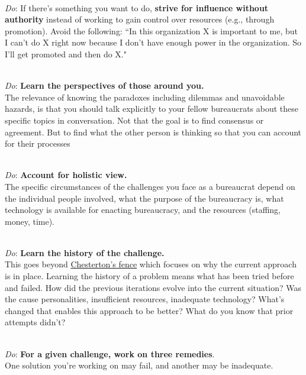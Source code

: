 \ \\
\textit{Do}: If there's something you want to do, \textbf{strive for influence without authority} instead of working to gain control over resources (e.g., through promotion). Avoid the following: ``In this organization X is important to me, but I can't do X right now because I don't have enough power in the organization. So I'll get promoted and then do X."

\ \\
\textit{Do}: \textbf{Learn the perspectives of those around you.}\\
The relevance of knowing the paradoxes including dilemmas and unavoidable hazards, is that you should talk explicitly to your fellow bureaucrats about these specific topics in conversation. Not that the goal is to find consensus or agreement. But to find what the other person is thinking so that you can account for their processes

\ \\
\textit{Do}: \textbf{Account for holistic view.}\\
The specific circumstances of the challenges you face as a bureaucrat depend on the individual people involved, what the purpose of the bureaucracy is, what technology is available for enacting bureaucracy, and the resources (staffing, money, time). 

\ \\
\textit{Do}: \textbf{Learn the history of the challenge.}\\
This goes beyond
\href{https://en.wikipedia.org/wiki/G._K._Chesterton\%23Chesterton's_fence}{Chesterton's fence}\iftoggle{haspagenumbers}{ (see page~\pageref{concept:chestertons_fence}), }{,}%
%
\iftoggle{WPinmargin}{\marginpar{$>$Wikipedia: Chesterton's fence}}{}%
which focuses on why the current approach is in place. Learning the history of a problem means what has been tried before and failed. How did the previous iterations evolve into the current situation? Was the cause personalities, insufficient resources, inadequate technology? What's changed that enables this approach to be better? What do you know that prior attempts didn't?

\ \\
\textit{Do}: \textbf{For a given challenge, work on three remedies}.\\
One solution you're working on may fail, and another may be inadequate. 

